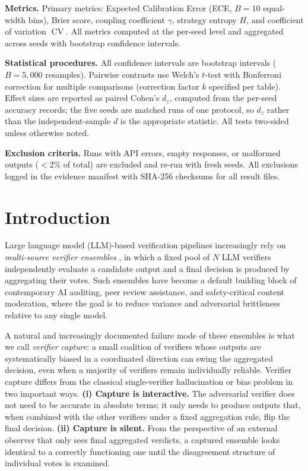 \documentclass[11pt]{article}
\DeclareMathOperator{\CV}{CV}
\begin{document}
\textbf{Metrics.} Primary metrics: Expected Calibration Error (ECE, $B{=}10$ equal-width bins), Brier score, coupling coefficient $\gamma$, strategy entropy $H$, and coefficient of variation $\CV$. All metrics computed at the per-seed level and aggregated across seeds with bootstrap confidence intervals.

\textbf{Statistical procedures.} All confidence intervals are bootstrap intervals ($B{=}5{,}000$ resamples). Pairwise contrasts use Welch's $t$-test with Bonferroni correction for multiple comparisons (correction factor $k$ specified per table). Effect sizes are reported as paired Cohen's $d_z$, computed from the per-seed accuracy records; the five seeds are matched runs of one protocol, so $d_z$ rather than the independent-sample $d$ is the appropriate statistic. All tests two-sided unless otherwise noted.

\textbf{Exclusion criteria.} Runs with API errors, empty responses, or malformed outputs ($<2\%$ of total) are excluded and re-run with fresh seeds. All exclusions logged in the evidence manifest with SHA-256 checksums for all result files.

\section{Introduction}
\label{sec:intro}

Large language model (LLM)-based verification pipelines increasingly rely on
\emph{multi-source verifier ensembles} \citep{cui2026edo,leung2026rubricllm}, in which a fixed pool
of $N$ LLM verifiers independently evaluate a candidate output and a final
decision is produced by aggregating their votes. Such ensembles have become a
default building block of contemporary AI auditing, peer review assistance,
and safety-critical content moderation, where the goal is to reduce variance
and adversarial brittleness relative to any single model.

A natural and increasingly documented failure mode of these ensembles is what
we call \emph{verifier capture}: a small coalition of verifiers whose outputs
are systematically biased in a coordinated direction can swing the aggregated
decision, even when a majority of verifiers remain individually reliable.
Verifier capture differs from the classical single-verifier hallucination or
bias problem in two important ways.
\textbf{(i) Capture is interactive.} The adversarial verifier does not need to
be accurate in absolute terms; it only needs to produce outputs that, when
combined with the other verifiers under a fixed aggregation rule, flip the
final decision.
\textbf{(ii) Capture is silent.} From the perspective of an external observer
that only sees final aggregated verdicts, a captured ensemble looks identical
to a correctly functioning one until the disagreement structure of individual
votes is examined.
\end{document}
